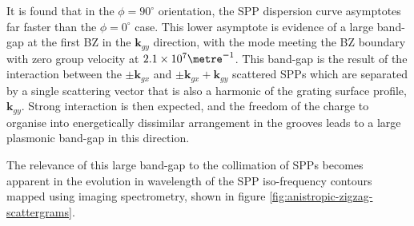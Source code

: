 It is found that in the $\phi=90^\circ$ orientation, the SPP dispersion curve asymptotes far faster than the $\phi=0^\circ$ case. This lower asymptote is evidence of a large band-gap at the first BZ in the $\mathbf{k}_{gy}$ direction, with the mode meeting the BZ boundary with zero group velocity at $2.1\times 10^{7} \metre^{-1}$. This band-gap is the result of the interaction between the $\pm\mathbf{k}_{gx}$ and $\pm\mathbf{k}_{gx}+\mathbf{k}_{gy}$ scattered SPPs which are separated by a single scattering vector that is also a harmonic of the grating surface profile, $\mathbf{k}_{gy}$. Strong interaction is then expected, and the freedom of the charge to organise into energetically dissimilar arrangement in the grooves leads to a large plasmonic band-gap in this direction.

The relevance of this large band-gap to the collimation of SPPs becomes apparent in the evolution in wavelength of the SPP iso-frequency contours mapped using imaging spectrometry, shown in figure \ref{fig:anistropic-zigzag-scattergrams}.


